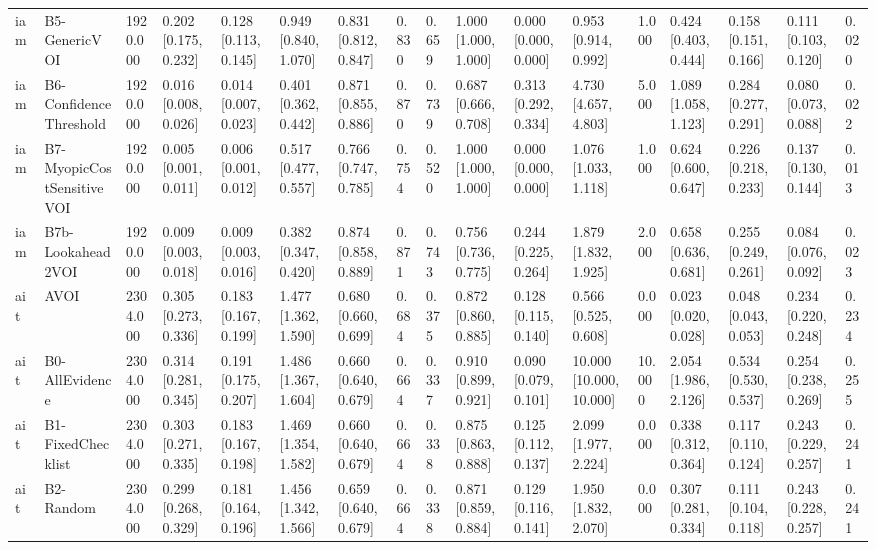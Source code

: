 \begin{table}[!ht]
{\begin{tabular}{lllllllllllllllll}
iam & B5-GenericVOI & 1920.000 & 0.202 [0.175, 0.232] & 0.128 [0.113, 0.145] & 0.949 [0.840, 1.070] & 0.831 [0.812, 0.847] & 0.830 & 0.659 & 1.000 [1.000, 1.000] & 0.000 [0.000, 0.000] & 0.953 [0.914, 0.992] & 1.000 & 0.424 [0.403, 0.444] & 0.158 [0.151, 0.166] & 0.111 [0.103, 0.120] & 0.020 \\
iam & B6-ConfidenceThreshold & 1920.000 & 0.016 [0.008, 0.026] & 0.014 [0.007, 0.023] & 0.401 [0.362, 0.442] & 0.871 [0.855, 0.886] & 0.870 & 0.739 & 0.687 [0.666, 0.708] & 0.313 [0.292, 0.334] & 4.730 [4.657, 4.803] & 5.000 & 1.089 [1.058, 1.123] & 0.284 [0.277, 0.291] & 0.080 [0.073, 0.088] & 0.022 \\
iam & B7-MyopicCostSensitiveVOI & 1920.000 & 0.005 [0.001, 0.011] & 0.006 [0.001, 0.012] & 0.517 [0.477, 0.557] & 0.766 [0.747, 0.785] & 0.754 & 0.520 & 1.000 [1.000, 1.000] & 0.000 [0.000, 0.000] & 1.076 [1.033, 1.118] & 1.000 & 0.624 [0.600, 0.647] & 0.226 [0.218, 0.233] & 0.137 [0.130, 0.144] & 0.013 \\
iam & B7b-Lookahead2VOI & 1920.000 & 0.009 [0.003, 0.018] & 0.009 [0.003, 0.016] & 0.382 [0.347, 0.420] & 0.874 [0.858, 0.889] & 0.871 & 0.743 & 0.756 [0.736, 0.775] & 0.244 [0.225, 0.264] & 1.879 [1.832, 1.925] & 2.000 & 0.658 [0.636, 0.681] & 0.255 [0.249, 0.261] & 0.084 [0.076, 0.092] & 0.023 \\
ait & AVOI & 2304.000 & 0.305 [0.273, 0.336] & 0.183 [0.167, 0.199] & 1.477 [1.362, 1.590] & 0.680 [0.660, 0.699] & 0.684 & 0.375 & 0.872 [0.860, 0.885] & 0.128 [0.115, 0.140] & 0.566 [0.525, 0.608] & 0.000 & 0.023 [0.020, 0.028] & 0.048 [0.043, 0.053] & 0.234 [0.220, 0.248] & 0.234 \\
ait & B0-AllEvidence & 2304.000 & 0.314 [0.281, 0.345] & 0.191 [0.175, 0.207] & 1.486 [1.367, 1.604] & 0.660 [0.640, 0.679] & 0.664 & 0.337 & 0.910 [0.899, 0.921] & 0.090 [0.079, 0.101] & 10.000 [10.000, 10.000] & 10.000 & 2.054 [1.986, 2.126] & 0.534 [0.530, 0.537] & 0.254 [0.238, 0.269] & 0.255 \\
ait & B1-FixedChecklist & 2304.000 & 0.303 [0.271, 0.335] & 0.183 [0.167, 0.198] & 1.469 [1.354, 1.582] & 0.660 [0.640, 0.679] & 0.664 & 0.338 & 0.875 [0.863, 0.888] & 0.125 [0.112, 0.137] & 2.099 [1.977, 2.224] & 0.000 & 0.338 [0.312, 0.364] & 0.117 [0.110, 0.124] & 0.243 [0.229, 0.257] & 0.241 \\
ait & B2-Random & 2304.000 & 0.299 [0.268, 0.329] & 0.181 [0.164, 0.196] & 1.456 [1.342, 1.566] & 0.659 [0.640, 0.679] & 0.664 & 0.338 & 0.871 [0.859, 0.884] & 0.129 [0.116, 0.141] & 1.950 [1.832, 2.070] & 0.000 & 0.307 [0.281, 0.334] & 0.111 [0.104, 0.118] & 0.243 [0.228, 0.257] & 0.241 \\

\end{tabular}}
\end{table}

